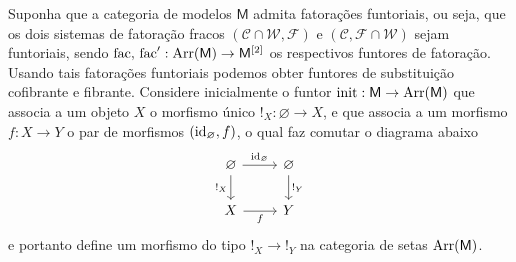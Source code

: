 \begin{obs}
  \label{obs:substituicoes_cofibrantes_fibrantes_funtoriais}
  Suponha que a categoria de modelos $\mathsf{M}$ admita fatorações funtoriais, ou seja, que os dois sistemas de fatoração fracos $(\mathcal{C} \cap \mathcal{W},\mathcal{F})$ e $(\mathcal{C},\mathcal{F} \cap \mathcal{W})$ sejam funtoriais, sendo $\mathrm{fac},\, \mathrm{fac}': \mathrm{Arr}(\mathsf{M}) \to \mathsf{M}^{[2]}$ os respectivos funtores de fatoração.
  Usando tais fatorações funtoriais podemos obter funtores de substituição cofibrante e fibrante.
  Considere inicialmente o funtor $\mathrm{init}: \mathsf{M} \to \mathrm{Arr}(\mathsf{M})$ que associa a um objeto $X$ o morfismo único $!_{X}: \varnothing \to X$, e que associa a um morfismo $f: X \to Y$ o par de morfismos $(\mathrm{id}_{\varnothing},f)$, o qual faz comutar o diagrama abaixo
  \begin{displaymath}
    \begin{tikzcd}
      \varnothing
      \arrow[d, "!_{X}" swap]
      \arrow[r, "\id_{\varnothing}"]
      & \varnothing
      \arrow[d, "!_{Y}"]
      \\ X
      \arrow[r, "f" swap]
      & Y
    \end{tikzcd}
  \end{displaymath}
  e portanto define um morfismo do tipo $!_{X} \to !_{Y}$ na categoria de setas $\mathrm{Arr}(\mathsf{M})$.


\end{obs}
